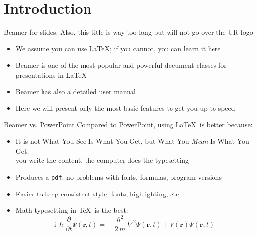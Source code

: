 \section{Introduction}
\begin{frame}{Beamer for slides. Also, this title is way too long but will not go over the UR logo}
\begin{itemize}
    \item We assume you can use \LaTeX; if you cannot,
    \href{http://en.wikibooks.org/wiki/LaTeX/}{you can learn it here}
    \item Beamer is one of the most popular and powerful document classes for presentations in \LaTeX
    \item Beamer has also a detailed
    \href{http://www.ctan.org/tex-archive/macros/latex/contrib/beamer/doc/beameruserguide.pdf}{user manual}
    \item Here we will present only the most basic features to get you up to speed
\end{itemize}
\end{frame}


\begin{frame}{Beamer vs. PowerPoint}
Compared to PowerPoint, using \LaTeX\ is better because:
\begin{itemize}
    \item It is not What-You-See-Is-What-You-Get, but What-You-\emph{Mean}-Is-What-You-Get:\\ you write the content, the computer does the typesetting
    \item Produces a \texttt{pdf}: no problems with fonts, formulas, program versions
    \item Easier to keep consistent style, fonts, highlighting, etc.
    \item Math typesetting in \TeX\ is the best:
\begin{equation*}
    \mathrm{i}\,\hslash\frac{\partial}{\partial t} \Psi(\mathbf{r},t) = -\frac{\hslash^2}{2\,m}\nabla^2\Psi(\mathbf{r},t) + V(\mathbf{r})\Psi(\mathbf{r},t)
\end{equation*}
\end{itemize}
\end{frame}



